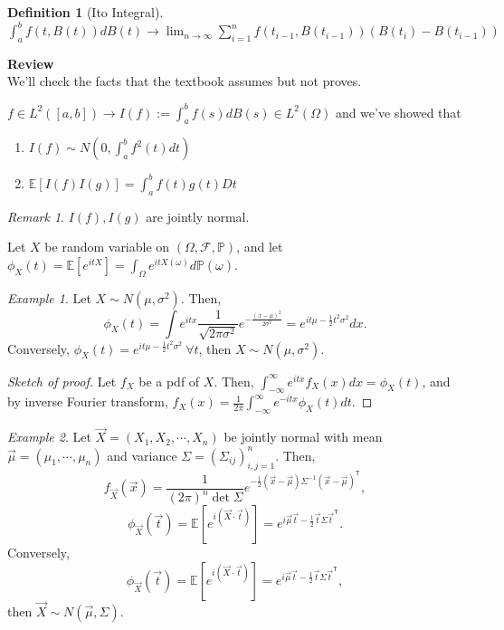 \documentclass[12pt]{report}
\renewcommand{\P}{\mathbb{P}}
\newcommand{\F}{\mathcal{F}}
\newcommand{\E}{\mathbb{E}}
\renewcommand{\1}{\mathbb{1}}
\renewcommand{\O}{\Omega}
\theoremstyle{break}
\theoremstyle{newdef}
\newtheorem{defn}[thm]{Definition} %
\theoremstyle{remark}
\newtheorem*{exmp}{Example} %
\newtheorem*{rem}{Remark} %
\begin{document}
\begin{defn}[Ito Integral]
$
\int_a^b f(t,B(t))dB(t) \rightarrow
\lim_{n\rightarrow\infty}\sum_{i=1}^n f(t_{i-1}, B(t_{i-1}))(B(t_i) - B(t_{i-1}))
$
\end{defn}

\vspace{5mm}

\textbf{Review}\\
We'll check the facts that the textbook assumes but not proves.

$f \in L^2([a,b]) \rightarrow I(f) := \int_a^b f(s)dB(s) \in L^2(\O)$ and we've showed that
\begin{enumerate}
\item
$I(f) \sim N(0,\int_a^b f^2(t)dt)$

\item
$\E[I(f)I(g)] = \int_a^b f(t)g(t)Dt$

\end{enumerate}
\begin{rem}
$I(f), I(g)$ are jointly normal.
\end{rem}

Let $X$ be random variable on $(\O,\F,\P)$, and let $\phi_X(t) = \E[e^{itX}] = \int_\O e^{itX(\omega)}d\P(\omega)$.


\begin{exmp}
Let $X \sim N(\mu, \sigma^2)$. Then,
$$
\phi_X(t) = \int e^{itx} \frac{1}{\sqrt{2\pi\sigma^2}} e^{-\frac{(x-\mu)^2}{2\sigma^2}} = e^{it\mu - \frac{1}{2}t^2\sigma^2}dx.
$$
Conversely, $\phi_X(t) = e^{it\mu - \frac{1}{2}t^2\sigma^2} \ \forall t$, then $X \sim N(\mu,\sigma^2)$.
\begin{proof}[Sketch of proof]
Let $f_X$ be a pdf of $X$.
Then, $\int_{-\infty}^\infty e^{itx}f_X(x)dx = \phi_X(t)$, and by inverse Fourier transform, $f_X(x) = \frac{1}{2\pi} \int_{-\infty}^\infty e^{-itx}\phi_X(t)dt$.
\end{proof}
\end{exmp}

\begin{exmp}
Let $\vec{X} = (X_1, X_2, \cdots, X_n)$ be jointly normal with mean $\vec{\mu} = (\mu_1,\cdots,\mu_n)$ and variance $\Sigma = (\Sigma_{ij})_{i,j=1}^n$.
Then,
$$
f_{\vec{X}}(\vec{x}) = \frac{1}{(2\pi)^n\det \Sigma} e^{-\frac{1}{2} (\vec{x}-\vec{\mu})\Sigma^{-1}(\vec{x}-\vec{\mu})^\mathsf{T}},
$$
$$
\phi_{\vec{X}}(\vec{t}) = \E\left[e^{i(\vec{X}\cdot\vec{t})}\right] = e^{i\vec{\mu}\vec{t} - \frac{1}{2}\vec{t} \Sigma \vec{t}^\mathsf{T}}.
$$
Conversely,
$$
\phi_{\vec{X}}(\vec{t}) = \E\left[e^{i(\vec{X}\cdot\vec{t})}\right] = e^{i\vec{\mu}\vec{t} - \frac{1}{2}\vec{t} \Sigma \vec{t}^\mathsf{T}},
$$
then $\vec{X} \sim N(\vec{\mu}, \Sigma)$.
\end{exmp}
\end{document}
